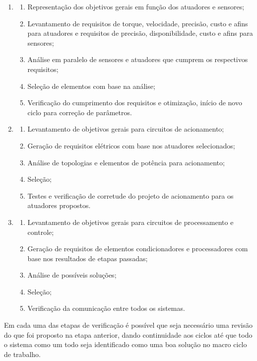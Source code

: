 \begin{enumerate}
    \item \begin{enumerate}
        \item Representação dos objetivos gerais em função dos atuadores e sensores;
        \item Levantamento de requisitos de torque, velocidade, precisão, custo e afins para atuadores e requisitos de precisão, disponibilidade, custo e afins para sensores;
        \item Análise em paralelo de sensores e atuadores que cumprem os respectivos requisitos;
        \item Seleção de elementos com base na análise;
        \item Verificação do cumprimento dos requisitos e otimização, início de novo ciclo para correção de parâmetros.
    \end{enumerate}
    \item \begin{enumerate}
        \item Levantamento de objetivos gerais para circuitos de acionamento;
        \item Geração de requisitos elétricos com base nos atuadores selecionados;
        \item Análise de topologias e elementos de potência para acionamento;
        \item Seleção;
        \item Testes e verificação de corretude do projeto de acionamento para os atuadores propostos.
    \end{enumerate}
    \item \begin{enumerate}
        \item Levantamento de objetivos gerais para circuitos de processamento e controle;
        \item Geração de requisitos de elementos condicionadores e processadores com base nos resultados de etapas passadas;
        \item Análise de possíveis soluções;
        \item Seleção;
        \item Verificação da comunicação entre todos os sistemas.        
    \end{enumerate}
\end{enumerate}

Em cada uma das etapas de verificação é possível que seja necessário uma revisão do que foi proposto na etapa anterior, dando continuidade aos ciclos até que todo
o sistema como um todo seja identificado como uma boa solução no macro ciclo de trabalho.

